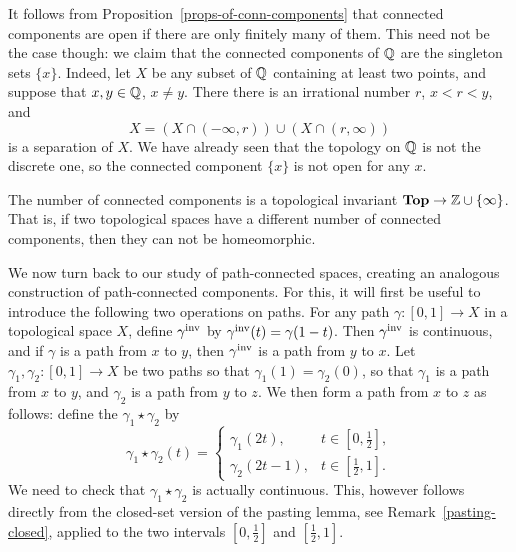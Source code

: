 \begin{example}
  It follows from Proposition~\ref{props-of-conn-components} that connected components are open if there are only finitely many of them. This need not be the case though: we claim that the connected components of $\mathbb{Q}$ are the singleton sets $\{x\}$. Indeed, let $X$ be any subset of $\mathbb{Q}$ containing at least two points, and suppose that $x, y \in \mathbb{Q}$, $x \not= y$. There there is an irrational number $r$, $x < r < y$, and 
  \[
    X = (X \cap (-\infty,r)) \cup (X \cap (r,\infty))
  \]
  is a separation of $X$. We have already seen that the topology on $\mathbb{Q}$ is not the discrete one, so the connected component $\{x\}$ is not open for any $x$.
\end{example}
\begin{rem}
  The number of connected components is a topological invariant $\mathbf{Top} \to \mathbb{Z} \cup \{\infty\}$. That is, if two topological spaces have a different number of connected components, then they can not be homeomorphic.
\end{rem}

We now turn back to our study of path-connected spaces, creating an analogous construction of path-connected components. For this, it will first be useful to introduce the following two operations on paths. For any path $\gamma : [0,1] \to X$ in a topological space $X$, define $\gamma^{\mathrm{inv}}$ by $\gamma^{\mathrm{inv}}(t) = \gamma(1-t)$. Then $\gamma^{\mathrm{inv}}$ is continuous, and if $\gamma$ is a path from $x$ to $y$, then $\gamma^{\mathrm{inv}}$ is a path from $y$ to $x$. Let $\gamma_1,\gamma_2 : [0,1] \to X$ be two paths so that $\gamma_1(1) = \gamma_2(0)$, so that $\gamma_1$ is a path from $x$ to $y$, and $\gamma_2$ is a path from $y$ to $z$. We then form a path from $x$ to $z$ as follows: define the  $\gamma_1 \star \gamma_2$ by
\[
  \gamma_1 \star \gamma_2(t) = \begin{cases} \gamma_1(2t), & t \in [0,\tfrac{1}{2}],\\ \gamma_2(2t-1), & t \in [\tfrac{1}{2},1]. \end{cases}
\]
We need to check that $\gamma_1 \star \gamma_2$ is actually continuous. This, however follows directly from the closed-set version of the pasting lemma, see Remark~\ref{pasting-closed}, applied to the two intervals $[0,\tfrac{1}{2}]$ and $[\tfrac{1}{2},1]$.

